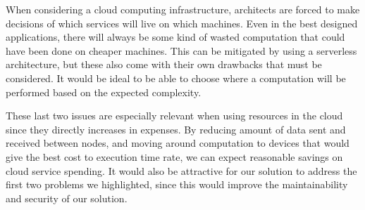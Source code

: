 When considering a cloud computing infrastructure, architects are forced to make decisions of which services will live on which machines. Even in the best designed applications, there will always be some kind of wasted computation that could have been done on cheaper machines. This can be mitigated by using a serverless architecture, but these also come with their own drawbacks that must be considered. It would be ideal to be able to choose where a computation will be performed based on the expected complexity.

These last two issues are especially relevant when using resources in the cloud since they directly increases in expenses. By reducing amount of data sent and received between nodes, and moving around computation to devices that would give the best cost to execution time rate, we can expect reasonable savings on cloud service spending. It would also be attractive for our solution to address the first two problems we highlighted, since this would improve the maintainability and security of our solution.


